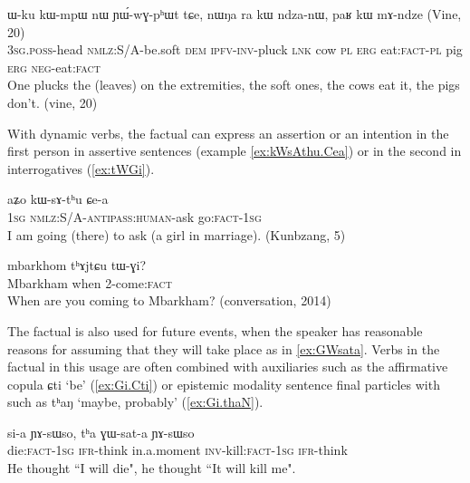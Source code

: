 \documentclass[oldfontcommands,oneside,a4paper,11pt]{article}
\newcommand{\ipa}[1]{{\phon \mbox{#1}}} %
\newcommand{\factual}[1]{\textsc{:fact}}
\begin{document}
\begin{exe}
\ex \label{ex:mAndze}
\gll
   	\ipa{ɯ-ku}  	\ipa{kɯ-mpɯ}  	\ipa{nɯ}  	\ipa{ɲɯ́-wɣ-pʰɯt}  	\ipa{tɕe,}  \ipa{nɯŋa}  	\ipa{ra}  	\ipa{kɯ}  	\ipa{ndza-nɯ,}  	\ipa{paʁ}  	\ipa{kɯ}  	\ipa{mɤ-ndze}  
(Vine, 20) \\
\textsc{3sg.poss}-head \textsc{nmlz}:S/A-be.soft \textsc{dem} \textsc{ipfv-inv}-pluck \textsc{lnk} cow \textsc{pl} \textsc{erg} eat:\textsc{fact-pl} pig \textsc{erg} \textsc{neg}-eat\factual{} \\
\glt  One plucks the (leaves) on the extremities, the soft ones, the cows eat it, the pigs don't. (vine, 20)
\end{exe}

 
With dynamic verbs, the factual can express an assertion or an intention in the first person in assertive sentences (example \ref{ex:kWsAthu.Cea}) or in the second in interrogatives (\ref{ex:tWGi}).

\begin{exe}
\ex \label{ex:kWsAthu.Cea}
\gll
\ipa{aʑo}  	\ipa{kɯ-sɤ-tʰu}  	\ipa{ɕe-a}  \\
\textsc{1sg} \textsc{nmlz}:S/A-\textsc{antipass:human}-ask go\factual{}-\textsc{1sg} \\
\glt I am going (there) to ask (a girl in marriage). (Kunbzang, 5)
\end{exe}

\begin{exe}
\ex \label{ex:tWGi}
\gll
\ipa{mbarkhom} \ipa{tʰɤjtɕu} \ipa{tɯ-ɣi}?\\
Mbarkham when 2-come\factual{} \\
\glt When are you coming to Mbarkham? (conversation, 2014)
\end{exe}

The factual is also used for future events, when the speaker has reasonable reasons for assuming that they will take place as in \ref{ex:GWsata}. Verbs in the factual in this usage are often combined with auxiliaries such as the affirmative copula \ipa{ɕti} `be' (\ref{ex:Gi.Cti}) or epistemic modality sentence final particles with  such as \ipa{tʰaŋ} `maybe, probably' (\ref{ex:Gi.thaN}).

\begin{exe}
\ex \label{ex:GWsata}
\gll
\ipa{si-a}   \ipa{ɲɤ-sɯso,} \ipa{tʰa}  	\ipa{ɣɯ-sat-a}  \ipa{ɲɤ-sɯso} \\
die:\textsc{fact-1sg} \textsc{ifr}-think in.a.moment \textsc{inv}-kill:\textsc{fact-1sg} \textsc{ifr}-think \\
\glt He thought ``I will die", he thought ``It will kill me".
\end{exe}
\end{document}
